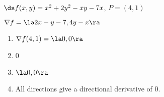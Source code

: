 {$\ds f(x,y) = x^2+2y^2-xy-7x$, $P = (4,1)$
}
{$\nabla f = \la 2x-y-7,4y-x\ra$
\begin{enumerate}
	\item $\nabla f(4,1) = \la 0,0\ra$
	\item	0
	\item	$\la 0,0\ra$
	\item	All directions give a directional derivative of 0.
\end{enumerate}
}
